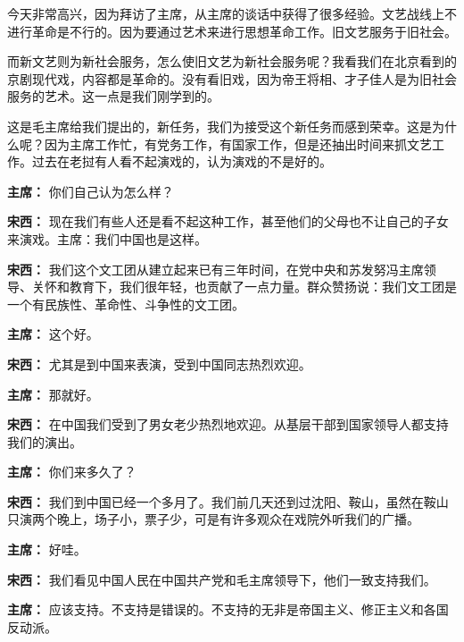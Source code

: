 \begin{list}{}
今天非常高兴，因为拜访了主席，从主席的谈话中获得了很多经验。文艺战线上不进行革命是不行的。因为要通过艺术来进行思想革命工作。旧文艺服务于旧社会。

而新文艺则为新社会服务，怎么使旧文艺为新社会服务呢？我看我们在北京看到的京剧现代戏，内容都是革命的。没有看旧戏，因为帝王将相、才子佳人是为旧社会服务的艺术。这一点是我们刚学到的。

这是毛主席给我们提出的，新任务，我们为接受这个新任务而感到荣幸。这是为什么呢？因为主席工作忙，有党务工作，有国家工作，但是还抽出时间来抓文艺工作。过去在老挝有人看不起演戏的，认为演戏的不是好的。

\item[\textbf{主席：}] 你们自己认为怎么样？

\item[\textbf{宋西：}] 现在我们有些人还是看不起这种工作，甚至他们的父母也不让自己的子女来演戏。主席：我们中国也是这样。

\item[\textbf{宋西：}] 我们这个文工团从建立起来已有三年时间，在党中央和苏发努冯主席领导、关怀和教育下，我们很年轻，也贡献了一点力量。群众赞扬说：我们文工团是一个有民族性、革命性、斗争性的文工团。

\item[\textbf{主席：}] 这个好。

\item[\textbf{宋西：}] 尤其是到中国来表演，受到中国同志热烈欢迎。

\item[\textbf{主席：}] 那就好。

\item[\textbf{宋西：}] 在中国我们受到了男女老少热烈地欢迎。从基层干部到国家领导人都支持我们的演出。

\item[\textbf{主席：}] 你们来多久了？

\item[\textbf{宋西：}] 我们到中国已经一个多月了。我们前几天还到过沈阳、鞍山，虽然在鞍山只演两个晚上，场子小，票子少，可是有许多观众在戏院外听我们的广播。

\item[\textbf{主席：}] 好哇。

\item[\textbf{宋西：}] 我们看见中国人民在中国共产党和毛主席领导下，他们一致支持我们。

\item[\textbf{主席：}] 应该支持。不支持是错误的。不支持的无非是帝国主义、修正主义和各国反动派。


\end{list}
